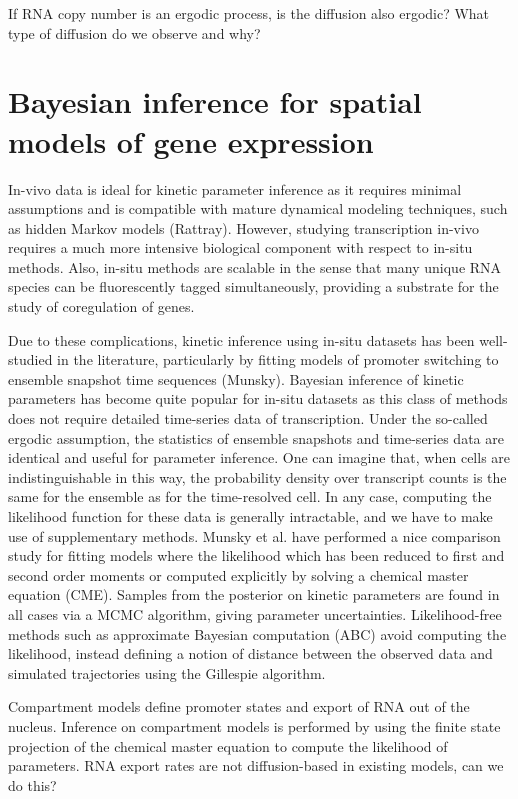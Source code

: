 \documentclass{article}
\begin{document}
If RNA copy number is an ergodic process, is the diffusion also ergodic? What type of diffusion do we observe and why? 

\section{Bayesian inference for spatial models of gene expression}

In-vivo data is ideal for kinetic parameter inference as it requires minimal assumptions and is compatible with mature dynamical modeling techniques, such as hidden Markov models (Rattray). However, studying transcription in-vivo requires a much more intensive biological component with respect to in-situ methods. Also, in-situ methods are scalable in the sense that many unique RNA species can be fluorescently tagged simultaneously, providing a substrate for the study of coregulation of genes.

Due to these complications, kinetic inference using  in-situ datasets has been well-studied in the literature, particularly by fitting models of promoter switching to ensemble snapshot time sequences (Munsky). Bayesian inference of kinetic parameters has become quite popular for in-situ datasets as this class of methods does not require detailed time-series data of transcription. Under the so-called ergodic assumption, the statistics of ensemble snapshots and time-series data are identical and useful for parameter inference. One can imagine that, when cells are indistinguishable in this way, the probability density over transcript counts is the same for the ensemble as for the time-resolved cell. In any case, computing the likelihood function for these data is generally intractable, and we have to make use of supplementary methods. Munsky et al. have performed a nice comparison study for fitting models where the likelihood which has been reduced to first and second order moments or computed explicitly by solving a chemical master equation (CME). Samples from the posterior on kinetic parameters are found in all cases via a MCMC algorithm, giving parameter uncertainties. Likelihood-free methods such as approximate Bayesian computation (ABC) avoid computing the likelihood, instead defining a notion of distance between the observed data and simulated trajectories using the Gillespie algorithm.


Compartment models define promoter states and export of RNA out of the nucleus. Inference on compartment models is performed by using the finite state projection of the chemical master equation to compute the likelihood of parameters. RNA export rates are not diffusion-based in existing models, can we do this?  
\end{document}
